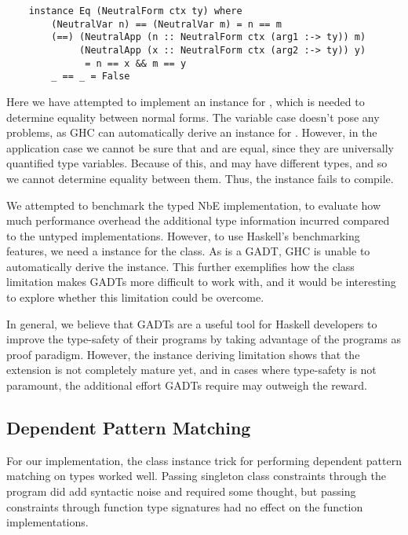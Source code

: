 \begin{lstlisting}
    instance Eq (NeutralForm ctx ty) where
        (NeutralVar n) == (NeutralVar m) = n == m
        (==) (NeutralApp (n :: NeutralForm ctx (arg1 :-> ty)) m) 
             (NeutralApp (x :: NeutralForm ctx (arg2 :-> ty)) y) 
              = n == x && m == y 
        _ == _ = False
\end{lstlisting}

Here we have attempted to implement an  instance for , which is needed to determine equality between normal forms. The variable case doesn't pose any problems, as GHC can automatically derive an  instance for . However, in the application case we cannot be sure that  and  are equal, since they are universally quantified type variables. Because of this,  and  may have different types, and so we cannot determine equality between them. Thus, the instance fails to compile.

We attempted to benchmark the typed NbE implementation, to evaluate how much performance overhead the additional type information incurred compared to the untyped implementations. However, to use Haskell's benchmarking features, we need a  instance for the  class. As  is a GADT, GHC is unable to automatically derive the instance. This further exemplifies how the class limitation makes GADTs more difficult to work with, and it would be interesting to explore whether this limitation could be overcome.

In general, we believe that GADTs are a useful tool for Haskell developers to improve the type-safety of their programs by taking advantage of the programs as proof paradigm. However, the instance deriving limitation shows that the extension is not completely mature yet, and in cases where type-safety is not paramount, the additional effort GADTs require may outweigh the reward. 

\subsection{Dependent Pattern Matching}

For our implementation, the class instance trick for performing dependent pattern matching on types worked well. Passing singleton class constraints through the program did add syntactic noise and required some thought, but passing constraints through function type signatures had no effect on the function implementations. 

